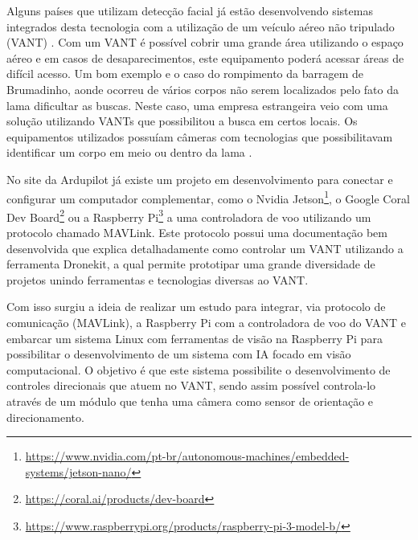 Alguns países que utilizam detecção facial já estão desenvolvendo sistemas integrados desta tecnologia com a utilização de um veículo aéreo não tripulado (VANT) \cite{dois}. Com um VANT é possível cobrir uma grande área utilizando o espaço aéreo e em casos de desaparecimentos, este equipamento poderá acessar áreas de difícil acesso. Um bom exemplo e o caso do rompimento da barragem de Brumadinho, aonde ocorreu de vários corpos não serem localizados pelo fato da lama dificultar as buscas. Neste caso, uma empresa estrangeira veio com uma solução utilizando VANTs que possibilitou a busca em certos locais. Os equipamentos utilizados possuíam câmeras com tecnologias que possibilitavam identificar um corpo em meio ou dentro da lama \cite{dezoito}.  


No site da Ardupilot \cite{tres} já existe um projeto em desenvolvimento para conectar e configurar um computador complementar, como o Nvidia Jetson\footnote{\url{https://www.nvidia.com/pt-br/autonomous-machines/embedded-systems/jetson-nano/}}, o Google Coral Dev Board\footnote{\url{https://coral.ai/products/dev-board}} ou a Raspberry Pi\footnote{\url{https://www.raspberrypi.org/products/raspberry-pi-3-model-b/}} a uma controladora de voo utilizando um protocolo chamado MAVLink. Este protocolo possui uma documentação bem desenvolvida que explica detalhadamente como controlar um VANT utilizando a ferramenta Dronekit, a qual permite prototipar uma grande diversidade de projetos unindo ferramentas e tecnologias diversas ao VANT.

Com isso surgiu a ideia de realizar um estudo para integrar, via protocolo de comunicação (MAVLink), a Raspberry Pi com a controladora de voo do VANT e embarcar um sistema Linux com ferramentas de visão na Raspberry Pi para possibilitar o desenvolvimento de um sistema com IA focado em visão computacional. O objetivo é que este sistema possibilite o desenvolvimento de controles direcionais que atuem no VANT, sendo assim possível controla-lo através de um módulo que tenha uma câmera como sensor de orientação e direcionamento. 







